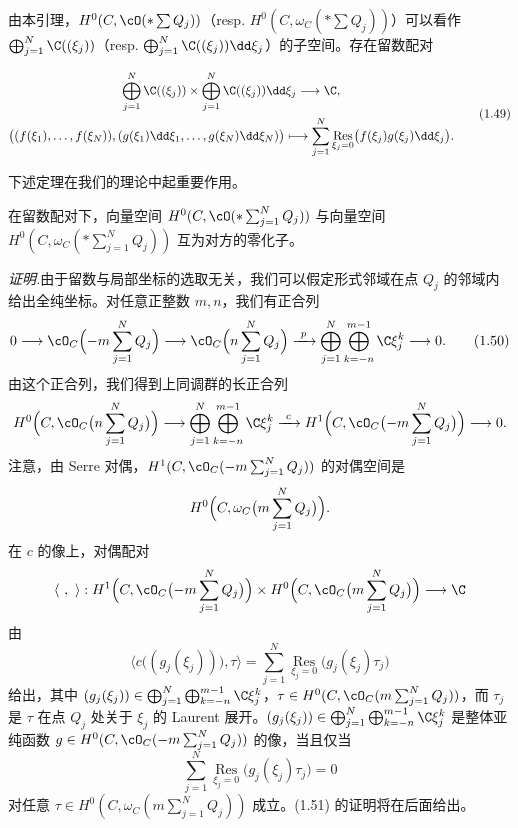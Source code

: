 由本引理，$H^0(C,\cO(\ast\sum Q_j))$（resp. $H^0(C,\omega_C(\ast\sum Q_j))$）可以看作 $\bigoplus_{j=1}^N\C((\xi_j))$（resp. $\bigoplus_{j=1}^N\C((\xi_j))\dd\xi_j$）的子空间。存在留数配对

\begin{equation}
\begin{gathered}
\bigoplus_{j=1}^N\C((\xi_j))\times\bigoplus_{j=1}^N\C((\xi_j))\dd\xi_j\longrightarrow\C,\\
\bigl((f(\xi_1),\dots,f(\xi_N)),(g(\xi_1)\dd\xi_1,\dots,g(\xi_N)\dd\xi_N)\bigr)
\longmapsto\sum_{j=1}^N\operatorname*{Res}_{\xi_j=0}\bigl(f(\xi_j)g(\xi_j)\dd\xi_j\bigr).
\end{gathered} \tag{1.49}
\end{equation}

下述定理在我们的理论中起重要作用。

\begin{theorem}[1.22]
在留数配对下，向量空间 $H^0(C,\cO(\ast\sum_{j=1}^N Q_j))$ 与向量空间 $H^0(C,\omega_C(\ast\sum_{j=1}^N Q_j))$ 互为对方的零化子。
\end{theorem}

\noindent\textit{证明.}\quad 由于留数与局部坐标的选取无关，我们可以假定形式邻域在点 $Q_j$ 的邻域内给出全纯坐标。对任意正整数 $m,n$，我们有正合列
\begin{equation}
0\longrightarrow\cO_C\Bigl(-m\sum_{j=1}^N Q_j\Bigr)\longrightarrow\cO_C\Bigl(n\sum_{j=1}^N Q_j\Bigr)\xrightarrow{\ p\ }\bigoplus_{j=1}^N\bigoplus_{k=-n}^{m-1}\C\xi_j^k\longrightarrow 0 . \tag{1.50}
\end{equation}
由这个正合列，我们得到上同调群的长正合列
\[
H^0\Bigl(C,\cO_C\bigl(n\sum_{j=1}^N Q_j\bigr)\Bigr)\longrightarrow\bigoplus_{j=1}^N\bigoplus_{k=-n}^{m-1}\C\xi_j^k\xrightarrow{\ c\ }H^1\Bigl(C,\cO_C\bigl(-m\sum_{j=1}^N Q_j\bigr)\Bigr)\longrightarrow 0 .
\]
注意，由 Serre 对偶，$H^1(C,\cO_C(-m\sum_{j=1}^N Q_j))$ 的对偶空间是
\[
H^0\Bigl(C,\omega_C\bigl(m\sum_{j=1}^N Q_j\bigr)\Bigr).
\]
在 $c$ 的像上，对偶配对
\[
\langle\ ,\ \rangle:H^1\Bigl(C,\cO_C\bigl(-m\sum_{j=1}^N Q_j\bigr)\Bigr)\times H^0\Bigl(C,\cO_C\bigl(m\sum_{j=1}^N Q_j\bigr)\Bigr)\longrightarrow\C
\]
由
\begin{equation}
\bigl\langle c\bigl((g_j(\xi_j))\bigr),\tau\bigr\rangle=\sum_{j=1}^N\operatorname*{Res}_{\xi_j=0}\bigl(g_j(\xi_j)\tau_j\bigr) \tag{1.51}
\end{equation}
给出，其中 $(g_j(\xi_j))\in\bigoplus_{j=1}^N\bigoplus_{k=-n}^{m-1}\C\xi_j^k$，$\tau\in H^0(C,\cO_C(m\sum_{j=1}^N Q_j))$，而 $\tau_j$ 是 $\tau$ 在点 $Q_j$ 处关于 $\xi_j$ 的 Laurent 展开。$(g_j(\xi_j))\in\bigoplus_{j=1}^N\bigoplus_{k=-n}^{m-1}\C\xi_j^k$ 是整体亚纯函数 $g\in H^0(C,\cO_C(-m\sum_{j=1}^N Q_j))$ 的像，当且仅当
\[
\sum_{j=1}^N\operatorname*{Res}_{\xi_j=0}\bigl(g_j(\xi_j)\tau_j\bigr)=0
\]
对任意 $\tau\in H^0(C,\omega_C(m\sum_{j=1}^N Q_j))$ 成立。(1.51) 的证明将在后面给出。

